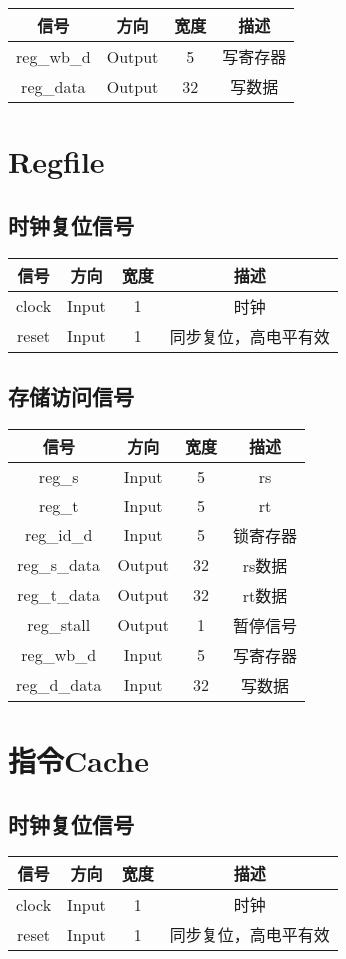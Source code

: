 \documentclass{article}
\newenvironment{signals}{
	\begin{center}
		\begin{tabular}{| c | c | c | c |}
			\hline
			信号 & 方向 & 宽度 & 描述 \\ \hline
}{
		\end{tabular}
	\end{center}
}
\newcommand\sigin{Input}
\newcommand\sigout{Output}
\begin{document}
\begin{signals}
	reg\_wb\_d & \sigout & 5 & 写寄存器 \\ \hline
	reg\_data & \sigout & 32 & 写数据 \\ \hline
\end{signals}

\section{Regfile}

\subsection{时钟复位信号}

\begin{signals}
	clock & \sigin & 1 & 时钟 \\ \hline
	reset & \sigin & 1 & 同步复位，高电平有效 \\ \hline
\end{signals}

\subsection{存储访问信号}

\begin{signals}
	reg\_s & \sigin & 5 & rs \\ \hline
	reg\_t & \sigin & 5 & rt \\ \hline
	reg\_id\_d & \sigin & 5 & 锁寄存器 \\ \hline
	reg\_s\_data & \sigout & 32 & rs数据 \\ \hline
	reg\_t\_data & \sigout & 32 & rt数据 \\ \hline
	reg\_stall & \sigout & 1 & 暂停信号 \\ \hline
	reg\_wb\_d & \sigin & 5 & 写寄存器 \\ \hline
	reg\_d\_data & \sigin & 32 & 写数据 \\ \hline
\end{signals}

\section{指令Cache}

\subsection{时钟复位信号}

\begin{signals}
	clock & \sigin & 1 & 时钟 \\ \hline
	reset & \sigin & 1 & 同步复位，高电平有效 \\ \hline
\end{signals}
\end{document}
